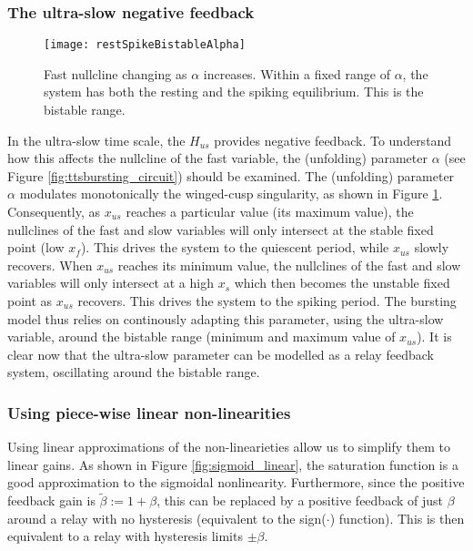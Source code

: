 \documentclass[a4paper, 12pt]{article}
\begin{document}
\subsubsection{The ultra-slow negative feedback}
\begin{figure}[h!]
\texttt{[image: restSpikeBistableAlpha]}
\caption{Fast nullcline changing as $\alpha$ increases. Within a fixed range of $\alpha$, the system has both the resting and the spiking equilibrium. This is the bistable range.}
\label{fig:alphaParameter}
\end{figure}
In the ultra-slow time scale, the $H_{us}$ provides negative feedback. To understand how this affects the nullcline of the fast variable, the (unfolding) parameter $\alpha$ (see Figure \ref{fig:ttsbursting_circuit}) should be examined. The (unfolding) parameter $\alpha$ modulates monotonically the winged-cusp singularity\cite{franci}, as shown in Figure \ref{fig:alphaParameter}. Consequently, as $x_{us}$ reaches a particular value (its maximum value), the nullclines of the fast and slow variables will only intersect at the stable fixed point (low $x_f$). This drives the system to the quiescent period, while $x_{us}$ slowly recovers. When $x_{us}$ reaches its minimum value, the nullclines of the fast and slow variables will only intersect at a high $x_{s}$ which then becomes the unstable fixed point as $x_{us}$ recovers. This drives the system to the spiking period. The bursting model thus relies on continously adapting this parameter, using the ultra-slow variable, around the bistable range (minimum and maximum value of $x_{us}$). 
It is clear now that the ultra-slow parameter can be modelled as a relay feedback system, oscillating around the bistable range. 


\subsubsection{Using piece-wise linear non-linearities}
Using linear approximations of the non-linearieties allow us to simplify them to linear gains. As shown in Figure \ref{fig:sigmoid_linear}, the saturation function is a good approximation to the sigmoidal nonlinearity. Furthermore, since the positive feedback gain is $\tilde{\beta}:=1 + \beta$, this can be replaced by a positive feedback of just $\beta$ around a relay with no hysteresis (equivalent to the sign($\cdot$) function). This is then equivalent to a relay with hysteresis limits $\pm \beta$. 
\end{document}
